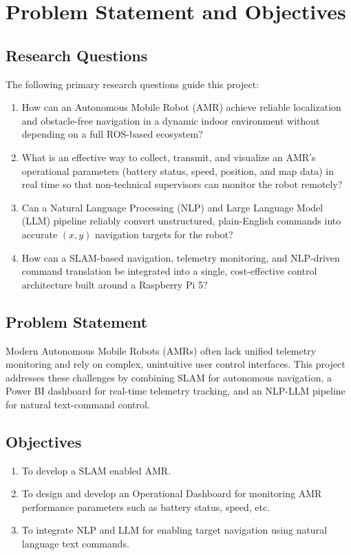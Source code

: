 \chapter{Problem Statement and Objectives}
\label{ch:problem_statement}
\label{chap:Problem Statement and Objectives}

\section{Research Questions}
The following primary research questions guide this project:
\begin{enumerate}
    \item How can an Autonomous Mobile Robot (AMR) achieve reliable localization and obstacle-free navigation in a dynamic indoor environment without depending on a full ROS-based ecosystem?
    \item What is an effective way to collect, transmit, and visualize an AMR's operational parameters (battery status, speed, position, and map data) in real time so that non-technical supervisors can monitor the robot remotely?
    \item Can a Natural Language Processing (NLP) and Large Language Model (LLM) pipeline reliably convert unstructured, plain-English commands into accurate $(x, y)$ navigation targets for the robot?
    \item How can a SLAM-based navigation, telemetry monitoring, and NLP-driven command translation be integrated into a single, cost-effective control architecture built around a Raspberry Pi 5?
\end{enumerate}

\section{Problem Statement}
Modern Autonomous Mobile Robots (AMRs) often lack unified telemetry monitoring and rely on complex, unintuitive user control interfaces. This project addresses these challenges by combining SLAM for autonomous navigation, a Power BI dashboard for real-time telemetry tracking, and an NLP-LLM pipeline for natural text-command control.

\section{Objectives}
\begin{enumerate}
    \item To develop a SLAM enabled AMR.
    \item To design and develop an Operational Dashboard for monitoring AMR performance parameters such as battery status, speed, etc.
    \item To integrate NLP and LLM for enabling target navigation using natural language text commands.
\end{enumerate}

